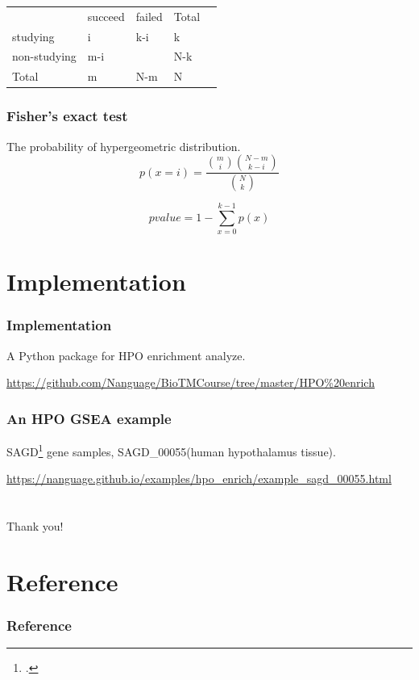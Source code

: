 \documentclass{beamer}
\begin{document}
\begin{frame}

    \begin{table}[]
    \begin{tabular}{lllll}
                 & succeed & failed & Total &  \\
    studying     & i       & k-i    & k     &  \\
    non-studying & m-i     &        & N-k   &  \\
    Total        & m       & N-m    & N     & 
    \end{tabular}
    \end{table}

    \frametitle{Fisher's exact test}
    The probability of hypergeometric distribution.
    \begin{equation}
        p(x=i) = \frac{ {m \choose i} { {N-m} \choose {k-i} } }{{N \choose k}}
    \end{equation}

    \begin{equation}
        pvalue = 1 - \sum_{x=0}^{k-1}{p(x)}
    \end{equation}
    

\end{frame}

\section{Implementation}

\begin{frame}
    \frametitle{Implementation}
    A Python package for HPO enrichment analyze.

    \small{
    \url{https://github.com/Nanguage/BioTMCourse/tree/master/HPO\%20enrich}
    }
    
\end{frame}

\begin{frame}
    \frametitle{An HPO GSEA example}

    SAGD\footcite{shi2018sagd} gene samples, SAGD\_00055(human hypothalamus tissue).

    \tiny{
    \url{https://nanguage.github.io/examples/hpo_enrich/example_sagd_00055.html}
    }
\end{frame}

\section{}

\begin{frame}
    Thank you!
\end{frame}

\section{Reference}
\begin{frame}
    \frametitle{Reference}
    \def\bibfont{\tiny}
    \printbibliography
\end{frame}
\end{document}
